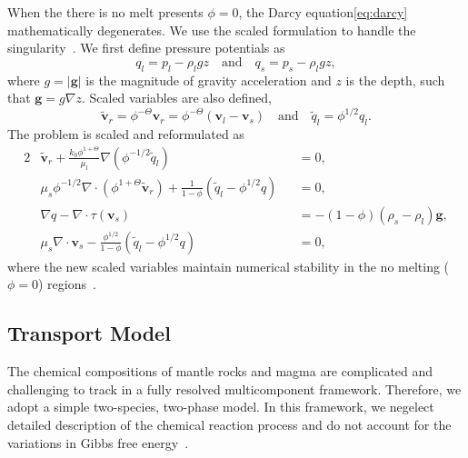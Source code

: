 When the there is no melt presents $\phi = 0$, the Darcy equation\eqref{eq:darcy} mathematically degenerates.
We use the scaled formulation to handle the singularity~\cite{DegenerateDarcy}.
We first define pressure potentials as
\begin{equation}
	q_l = p_l - \rho_l g z\quad\text{and}\quad q_s = p_s - \rho_l g z,
\end{equation}
where $g=|\mathbf{g}|$ is the magnitude of gravity acceleration and $z$ is the 
depth, such that $\mathbf{g}=g\nabla z$. Scaled variables are also defined,
\begin{equation}\label{eq:scaledVariables}
		  \tilde{\mathbf{v}}_r = \phi^{-\Theta}\mathbf{v}_r = \phi^{-\Theta}(\mathbf{v}_l-\mathbf{v}_s)
	\quad\text{and}\quad
	\tilde{q}_l = \phi^{1/2}q_l.
\end{equation}
The problem is scaled and reformulated as 
\begin{alignat}{2}
\label{eq:darcy_flow_sc}
		  &\tilde{\mathbf{v}}_r
		  + \frac{k_0\phi^{1+\Theta}}{\mu_l}\nabla(\phi^{-1/2}\tilde{q}_l)
        &&= 0,\\
\label{eq:consMass_flow_sc}
		  &\mu_s\phi^{-1/2}\nabla \cdot(\phi^{1+\Theta}\tilde{\mathbf{v}}_r)
        + \frac{1}{1-\phi}(\tilde{q}_l - \phi^{1/2}q) &&=0,\\
\label{eq:stokes_flow_sc}
		  &\nabla q - \nabla \cdot \tau(\mathbf{v}_s) &&= -(1-\phi)(\rho_s-\rho_l) \mathbf{g},\\
\label{eq:compaction_flow_sc}
		  &\mu_s\nabla \cdot \mathbf{v}_s
        - \frac{\phi^{1/2}}{1-\phi}(\tilde{q}_l - \phi^{1/2}q) &&=0,
\end{alignat}
where the new scaled variables maintain numerical stability in the no melting ($\phi=0$) regions~\cite{DegenerateDarcy}.

\subsection{Transport Model}
The chemical compositions of mantle rocks and magma are complicated and challenging to 
track in a fully resolved multicomponent framework.
Therefore, we adopt a simple two-species, two-phase model. 
In this framework, we negelect detailed description of the chemical reaction 
process and do not account for the variations in Gibbs free 
energy~\cite{ConsequencesMeltTransport,PartialMeltinginUpwellingMantleColumn,MagmaDynamicsEnthalpyMethod,DownwardOxidantTransport}. 

